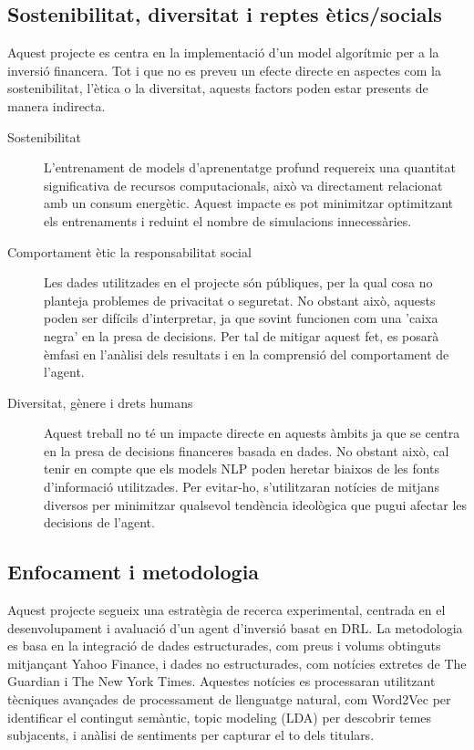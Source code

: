 \documentclass[12pt,a4paper,twoside]{book}
\begin{document}
\subsection{Sostenibilitat, diversitat i reptes ètics/socials}

Aquest projecte es centra en la implementació d'un model algorítmic per a la inversió financera. Tot i que no es preveu un efecte directe en aspectes com la sostenibilitat, l'ètica o la diversitat, aquests factors poden estar presents de manera indirecta.

\begin{description}
    \item[Sostenibilitat] L'entrenament de models d'aprenentatge profund requereix una quantitat significativa de recursos computacionals, això va directament relacionat amb un consum energètic. Aquest impacte es pot minimitzar optimitzant els entrenaments i reduint el nombre de simulacions innecessàries.
    \item[Comportament ètic la responsabilitat social] Les dades utilitzades en el projecte són públiques, per la qual cosa no planteja problemes de privacitat o seguretat. No obstant això, aquests poden ser difícils d'interpretar, ja que sovint funcionen com una 'caixa negra' en la presa de decisions. Per tal de mitigar aquest fet, es posarà èmfasi en l'anàlisi dels resultats i en la comprensió del comportament de l'agent.
    \item[Diversitat, gènere i drets humans] Aquest treball no té un impacte directe en aquests àmbits ja que se centra en la presa de decisions financeres basada en dades. No obstant això, cal tenir en compte que els models NLP poden heretar biaixos de les fonts d'informació utilitzades. Per evitar-ho, s'utilitzaran notícies de mitjans diversos per minimitzar qualsevol tendència ideològica que pugui afectar les decisions de l'agent.
\end{description}

\subsection{Enfocament i metodologia}

Aquest projecte segueix una estratègia de recerca experimental, centrada en el desenvolupament i avaluació d'un agent d'inversió basat en DRL. La metodologia es basa en la integració de dades estructurades, com preus i volums obtinguts mitjançant Yahoo Finance\cite{YahooFinance}, i dades no estructurades, com notícies extretes de The Guardian\cite{TheGuardian} i The New York Times\cite{NYTimes}. Aquestes notícies es processaran utilitzant tècniques avançades de processament de llenguatge natural, com Word2Vec per identificar el contingut semàntic, topic modeling (LDA) per descobrir temes subjacents, i anàlisi de sentiments per capturar el to dels titulars.
\end{document}
